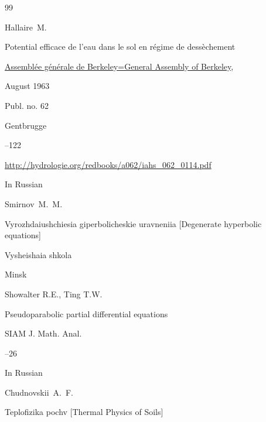 \begin{thebibliography}{99}




\by Hallaire~M.

\paper Potential efficace de l'eau dans le sol en r\'egime de dess\`echement 

\inbook \href{http://hydrologie.org/redbooks/062.htm}{Assembl\'ee g\'en\'erale de Berkeley=General Assembly of Berkeley}\rm, \nofrills

\procinfo August 1963

\bookinfo Publ. no. 62


\publaddr Gentbrugge

--122 

\elink \url{http://hydrologie.org/redbooks/a062/iahs_062_0114.pdf}




\lang In Russian

\by Smirnov~M.~M.

\book Vyrozhdaiushchiesia giperbolicheskie uravneniia \rm [Degenerate hyperbolic equations]


\publ Vysheishaia shkola

\publaddr Minsk











\by Showalter R.E., Ting T.W.

\paper Pseudoparabolic partial differential equations

\jour SIAM J. Math. Anal.




--26





\lang In Russian

\by Chudnovskii~A.~F.

\book Teplofizika pochv \rm [Thermal Physics of Soils]


\end{thebibliography}
